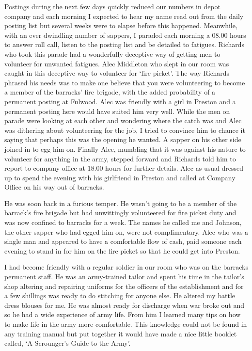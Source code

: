 Postings during the next few days quickly reduced our numbers in depot
company and each morning I expected to hear my name read out from the
daily posting list but several weeks were to elapse before this
happened. Meanwhile, with an ever dwindling number of sappers, I
paraded each morning a 08.00 hours to answer roll call, listen to the
posting list and be detailed to fatigues. \CsergeantM
Richards who took this parade had a wonderfully deceptive way of
getting men to volunteer for unwanted fatigues. Alec Middleton who
slept in our room was caught in this deceptive way to volunteer for
`fire picket'. The way \sergeantM Richards phrased his needs was to
make one believe that you were volunteering to become a member of the
barracks' fire brigade, with the added probability of a permanent
posting at Fulwood. Alec was friendly with a girl in Preston and a
permanent posting here would have suited him very well. While the men
on parade were looking at each other and wondering where the catch was
and Alec was dithering about volunteering for the job, I tried to
convince him to chance it saying that perhaps this was the opening he
wanted. A sapper on his other side joined in to egg him on. Finally
Alec, mumbling that it was against his nature to volunteer for
anything in the army, stepped forward and \sergeantM Richards told him to
report to company office at 18.00 hours for further details. Alec as
usual dressed up to spend the evening with his girlfriend in Preston
and called at Company Office on his way out of barracks.

He was soon back in a furious temper. He wasn't going to be a member
of the barrack's fire brigade but had unwittingly volunteered for fire
picket duty and was now confined to barracks for a week. The names he
called me and Johnson, the other sapper who had egged him on, were not
complimentary. Alec who was a single man and appeared to have a
comfortable flow of cash, paid someone each evening to stand in for
him on the fire picket so that he could get into Preston.

I had become friendly with a regular soldier in our room who was on
the barracks permanent staff. He was an army-trained tailor and spent
his time in the tailor's shop altering and repairing uniforms for the
officers of the establishment and for a few shillings was ready to do
stitching for anyone else. He altered my battle dress blouses for
me. He was almost ready for discharge when war broke out and so he had
a wide experience of army life. From him I learned many tips on how
to make life in the army more comfortable. This knowledge could not be
found in any training manual but put together it would have made a
nice little booklet called, `A Scrounger's Guide to the Army'.

